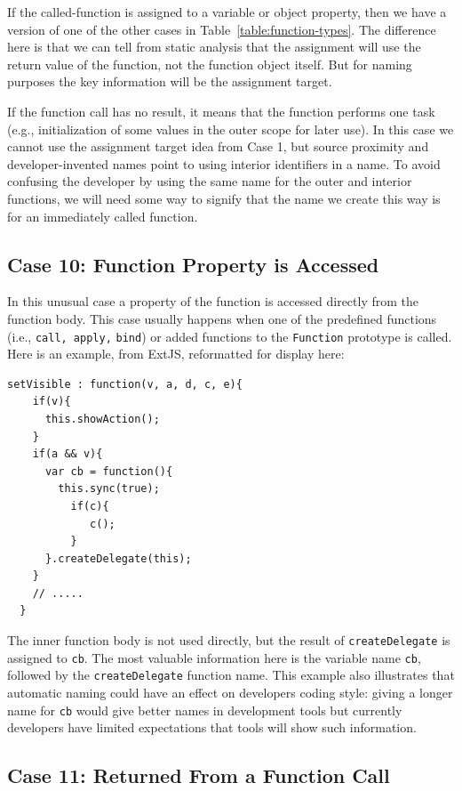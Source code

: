 \documentclass[10pt, preprint]{sigplanconf}
\begin{document}
If the called-function is assigned to a variable or object property, then we have a version of one of the other cases in Table~\ref{table:function-types}. The difference here is that we can tell from static analysis that the assignment will use the return value of the function, not the function object itself. But for naming purposes the key information will be the assignment target.

If the function call has no result, it means that the function performs one task (e.g., initialization of some values in the outer scope for later use). In this case we cannot use the assignment target idea from Case 1, but source proximity and developer-invented names point to using interior identifiers in a name. To avoid confusing the developer by using the same name for the outer and interior functions, we will need some way to signify that the name we create this way is for an immediately called function.

\subsection{Case 10: Function Property is Accessed}
\label{sec:funcprop}
In this unusual case a property of the function is accessed directly from the function body. This case usually happens when one of the predefined functions (i.e., \verb|call, apply,| \verb|bind|) or added functions to the \verb|Function| prototype is called.  Here is an example, from ExtJS, reformatted for display here:
\lstset{basicstyle=\scriptsize}
\begin{lstlisting}[frame=single, language=myLang]
  setVisible : function(v, a, d, c, e){
    if(v){
      this.showAction();
    }
    if(a && v){
      var cb = function(){
        this.sync(true);
          if(c){
             c();
          }
      }.createDelegate(this);
    }
    // .....
  }
\end{lstlisting}
The inner function body is not used directly, but the result of \verb|createDelegate| is assigned to \verb|cb|. The most valuable information here is the variable name \verb|cb|, followed by the \verb|createDelegate| function name.  This example also illustrates that automatic naming could have an effect on developers coding style:  giving a longer name for \verb|cb| would give better names in development tools but currently developers have limited expectations that tools will show such information.

\subsection{Case 11:  Returned From a Function Call}
\end{document}
